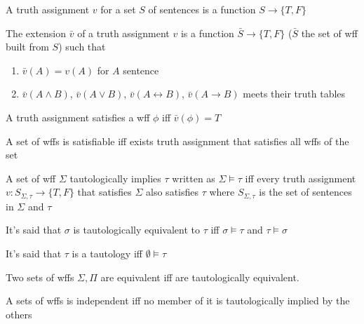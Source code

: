 \documentclass[../main.tex]{subfiles}
\begin{document}
\begin{definition}
    A truth assignment $v$ for a set $S$ of sentences is a function $S\rightarrow\{T,F\}$
\end{definition}
\begin{definition}
    The extension $\bar{v}$ of a truth assignment $v$ is a function $\bar{S}\rightarrow\{T,F\}$ ($\bar{S}$ the set of wff built from $S$) such that
    \begin{enumerate}
        \item $\bar{v}(A) = v(A)$ for $A$ sentence
        \item $\bar{v}(A\wedge B)$, $\bar{v}(A\vee B)$, $\bar{v}(A\leftrightarrow B)$, $\bar{v}(A\rightarrow B)$ meets their truth tables
    \end{enumerate}
\end{definition}
\begin{definition}
    A truth assignment satisfies a wff $\phi$ iff $\bar{v}(\phi) = T$
\end{definition}
\begin{definition}
    A set of wffs is satisfiable iff exists truth assignment that satisfies all wffs of the set
\end{definition}
\begin{definition}
    A set of wff $\Sigma$ tautologically implies $\tau$ written as $\Sigma\models\tau$ iff every truth assignment $v:S_{\Sigma, \tau} \rightarrow \{T,F\}$ that satisfies $\Sigma$ also satisfies $\tau$ where $S_{\Sigma, \tau}$ is the set of sentences in $\Sigma$ and $\tau$
\end{definition}
\begin{definition}
    It's said that $\sigma$ is tautologically equivalent to $\tau$ iff $\sigma\models\tau$ and $\tau\models\sigma$
\end{definition}
\begin{definition}[Tautology]
    It's said that $\tau$ is a tautology iff $\emptyset\models\tau$
\end{definition}
\begin{definition}
    Two sets of wffs $\Sigma, \Pi$ are equivalent iff are tautologically equivalent.
\end{definition}
\begin{definition}
    A sets of wffs is independent iff no member of it is tautologically implied by the others 
\end{definition}
\end{document}
